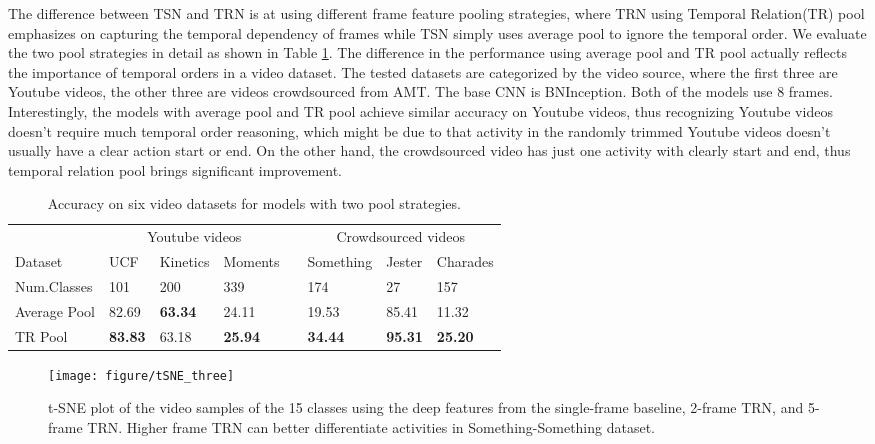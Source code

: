 \documentclass[runningheads]{llncs}
\begin{document}
The difference between TSN and TRN is at using different frame feature pooling strategies, where TRN using Temporal Relation(TR) pool emphasizes on capturing the temporal dependency of frames while TSN simply uses average pool to ignore the temporal order. We evaluate the two pool strategies in detail as shown in Table \ref{datasets_pool}. The difference in the performance using average pool and TR pool actually reflects the importance of temporal orders in a video dataset. The tested datasets are categorized by the video source, where the first three are Youtube videos, the other three are videos crowdsourced from AMT. The base CNN is BNInception. Both of the models use 8 frames. Interestingly, the models with average pool and TR pool achieve similar accuracy on Youtube videos, thus recognizing Youtube videos doesn't require much temporal order reasoning, which might be due to that activity in the randomly trimmed Youtube videos doesn't usually have a clear action start or end. On the other hand, the crowdsourced video has just one activity with clearly start and end, thus temporal relation pool brings significant improvement.

\begin{table}
\vspace{-6mm}
\begin{center}
\begin{tabular}{p{2.1cm} p{1.4cm} p{1.4cm} p{1.5cm} p{0.1cm} p{1.7cm}  p{1.3cm} p{1.8cm}}\hline
 & \multicolumn{3}{c}{Youtube videos} & & \multicolumn{3}{c}{Crowdsourced videos} \\ \cmidrule{2-4} \cmidrule{6-8} 
 Dataset & UCF & Kinetics & Moments & & Something & Jester & Charades\\
 \hline
 Num.Classes & 101 & 200 & 339 & & 174 & 27 & 157 \\
\hline
Average Pool & 82.69 & \textbf{63.34} &  24.11 & & 19.53 & 85.41 & 11.32  \\
TR Pool & \textbf{83.83} & 63.18 & \textbf{25.94} &  & \textbf{34.44} &  \textbf{95.31} & \textbf{25.20}\\
\hline
\end{tabular}
\caption{Accuracy on six video datasets for models with two pool strategies.}
\label{datasets_pool}
\end{center}
\vspace{-12mm}
\end{table}



\begin{figure}
\vspace{-10mm}
\centering
\texttt{[image: figure/tSNE\_three]}
\vspace{-4mm}
\caption{t-SNE plot of the video samples of the 15 classes using the deep features from the single-frame baseline, 2-frame TRN, and 5-frame TRN. Higher frame TRN can better differentiate activities in Something-Something dataset.}
\vspace{-5mm}
\label{tsne}
\end{figure}
\end{document}
